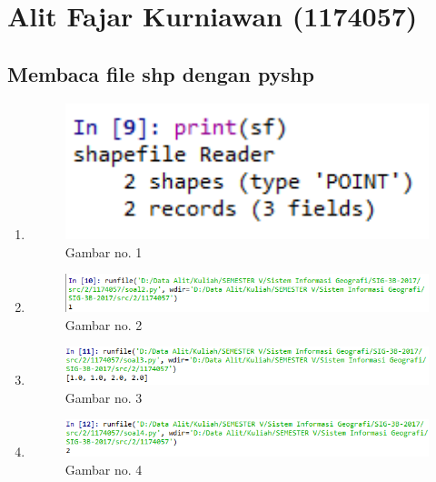 \section{Alit Fajar Kurniawan (1174057)}
\subsection{Membaca file shp dengan pyshp}
\begin{enumerate}
	\item 
	
	\begin{figure}[H]
		\includegraphics[width=12cm]{figures/1174057/fajar1.PNG}
		\centering
		\caption{Gambar no. 1}
	\end{figure}
	
	\item 
	
	\begin{figure}[H]
		\includegraphics[width=12cm]{figures/1174057/fajar2.PNG}
		\centering
		\caption{Gambar no. 2}
	\end{figure}
	
	\item 
	
	\begin{figure}[H]
		\includegraphics[width=12cm]{figures/1174057/fajar3.PNG}
		\centering
		\caption{Gambar no. 3}
	\end{figure}
	
	\item 
	
	\begin{figure}[H]
		\includegraphics[width=12cm]{figures/1174057/fajar4.PNG}
		\centering
		\caption{Gambar no. 4}
	\end{figure}
	

\end{enumerate}
